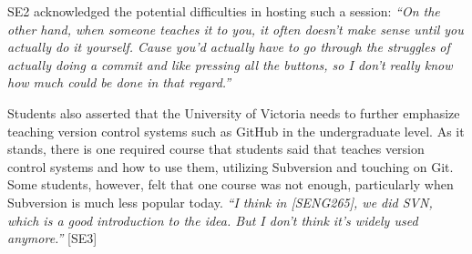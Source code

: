 


SE2 acknowledged the potential difficulties in hosting such a session: \textit{``On the other hand, when someone teaches it to you, it often doesn't make sense until you actually do it yourself. Cause you'd actually have to go through the struggles of actually doing a commit and like pressing all the buttons, so I don't really know how much could be done in that regard.''}

Students also asserted that the University of Victoria needs to further emphasize teaching version control systems such as GitHub in the undergraduate level. As it stands, there is one required course that students said that teaches version control systems and how to use them, utilizing Subversion and touching on Git. Some students, however, felt that one course was not enough, particularly when Subversion is much less popular today. \textit{``I think in [SENG265], we did SVN, which is a good introduction to the idea. But I don't think it's widely used anymore.''} [SE3]



